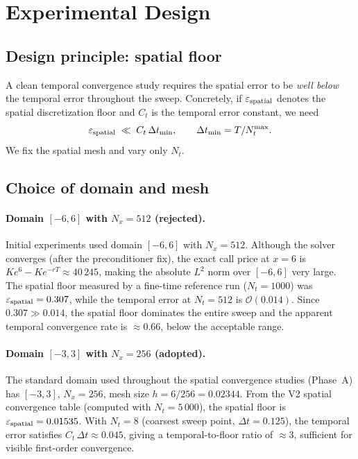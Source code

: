 \documentclass[11pt,a4paper]{article}
\newcommand{\Nx}{N_x}
\newcommand{\Nt}{N_t}
\newcommand{\dt}{\Delta t}
\newcommand{\bigo}[1]{\mathcal{O}(#1)}
\newcommand{\eps}{\varepsilon}
\begin{document}
\section{Experimental Design}

\subsection{Design principle: spatial floor}

A clean temporal convergence study requires the spatial error to be
\emph{well below} the temporal error throughout the sweep.  Concretely,
if $\eps_{\rm spatial}$ denotes the spatial discretization floor and
$C_t$ is the temporal error constant, we need
\[
  \eps_{\rm spatial} \;\ll\; C_t\,\dt_{\rm min},
  \qquad \dt_{\rm min} = T/\Nt^{\rm max}.
\]
We fix the spatial mesh and vary only $\Nt$.

\subsection{Choice of domain and mesh}

\paragraph{Domain $[-6,6]$ with $\Nx=512$ (rejected).}
Initial experiments used domain $[-6,6]$ with $\Nx=512$.  Although the
solver converges (after the preconditioner fix), the exact call price
at $x = 6$ is $K e^6 - K e^{-r T} \approx 40\,245$, making the
absolute $L^2$ norm over $[-6,6]$ very large.  The spatial floor
measured by a fine-time reference run ($\Nt=1000$) was
$\eps_{\rm spatial} = 0.307$, while the temporal error at
$\Nt=512$ is $\bigo{0.014}$.  Since $0.307 \gg 0.014$, the spatial
floor dominates the entire sweep and the apparent temporal convergence
rate is $\approx 0.66$, below the acceptable range.

\paragraph{Domain $[-3,3]$ with $\Nx=256$ (adopted).}
The standard domain used throughout the spatial convergence
studies (Phase~A) has $[-3,3]$, $\Nx=256$, mesh size
$h = 6/256 = 0.02344$.  From the V2 spatial convergence table
(computed with $\Nt=5\,000$), the spatial floor is
$\eps_{\rm spatial} = 0.01535$.  With $\Nt=8$ (coarsest sweep point,
$\dt=0.125$), the temporal error satisfies $C_t\,\dt \approx 0.045$,
giving a temporal-to-floor ratio of $\approx 3$, sufficient for
visible first-order convergence.
\end{document}
